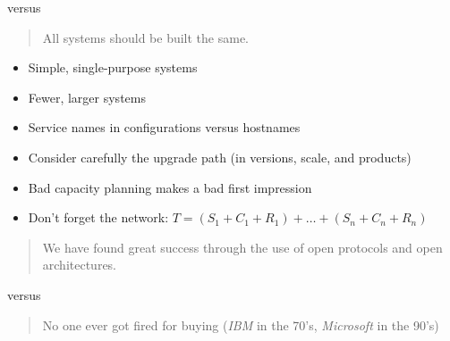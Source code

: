 \documentclass{slides}
\newcommand{\bi}{\begin{itemize}}
\newcommand{\ei}{\end{itemize}}
\begin{document}
versus

\begin{quotation}
All systems should be built the same.
\end{quotation}


\bi
\item Simple, single-purpose systems
\item Fewer, larger systems 
\item Service names in configurations versus hostnames
\item Consider carefully the upgrade path (in versions, scale, and products)
\item Bad capacity planning makes a bad first impression
\item Don't forget the network:
	$T = (S_1 + C_1 + R_1) + \ldots + (S_n + C_n + R_n)$
\ei


\begin{quotation}
We have found great success through the use of open protocols 
and open architectures.
\end{quotation}

versus

\begin{quotation}
No one ever got fired for buying 
(\emph{IBM} in the 70's, \emph{Microsoft} in the 90's)
\end{quotation}
\end{document}
